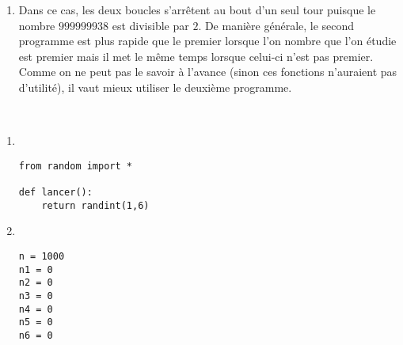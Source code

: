 \begin{correction}
\begin{enumerate}
		\item Dans ce cas, les deux boucles s'arrêtent au bout d'un seul tour puisque le nombre $999999938$ est divisible par $2$. De manière générale, le second programme est plus rapide que le premier lorsque l'on nombre que l'on étudie est premier mais il met le même temps lorsque celui-ci n'est pas premier. Comme on ne peut pas le savoir à l'avance (sinon ces fonctions n'auraient pas d'utilité), il vaut mieux utiliser le deuxième programme.
	\end{enumerate}
\end{correction}


\begin{correction}~
	\begin{enumerate}
		\item ~
		\begin{center}
			\begin{varwidth}[t]{.5\textwidth}
				\begin{lstlisting}[language=iPython,linewidth = 8cm]
from random import *

def lancer():
    return randint(1,6)
\end{lstlisting}\end{varwidth}\end{center}
	\item ~
\begin{center}
			\begin{varwidth}[t]{.5\textwidth}
				\begin{lstlisting}[language=iPython,linewidth = 6cm]
n = 1000
n1 = 0
n2 = 0
n3 = 0
n4 = 0
n5 = 0
n6 = 0


\end{lstlisting}
\end{varwidth}
\end{center}
\end{enumerate}
\end{correction}
